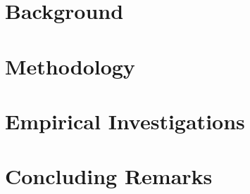 \documentclass[g5paper,twoside,phd,electronic]{kthesis}
\begin{document}
\frontmatter
\maketitle
\makecopyright
\makededication



\tableofcontents*
\listoffigures
\listoftables
\listofalgorithms
\mainmatter

\newpage
\part{Background}

\newpage

\newpage

\newpage

\newpage
\part{Methodology}

\newpage
\part{Empirical Investigations}

\newpage

\newpage

\newpage

\newpage

\newpage
\part{Concluding Remarks}

\newpage

\backmatter
\printindex

\end{document}
